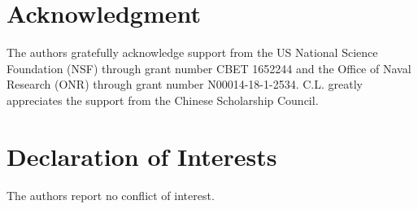 \documentclass{jfm}
\newcommand{\rev}[1]{{\color{black}#1}}
\begin{document}


\section*{Acknowledgment}
The authors gratefully acknowledge support from the US National Science Foundation (NSF) through grant number CBET 1652244 and the Office of Naval Research (ONR) through grant number N00014-18-1-2534. C.L. greatly appreciates the support from the Chinese Scholarship Council.

\section*{Declaration of Interests}
The authors report no conflict of interest.

\rev{
\appendix

}


\end{document}
